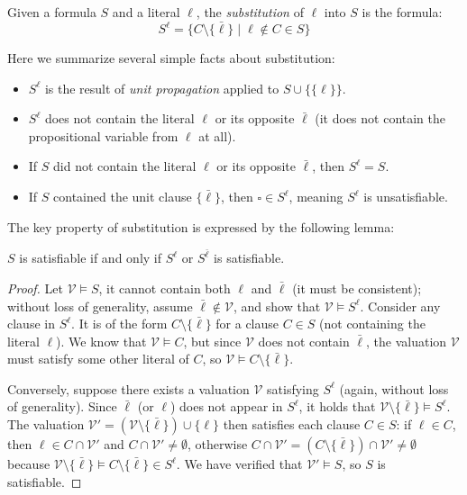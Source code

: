 \begin{definition}
    Given a formula $S$ and a literal $\ell$, the \emph{substitution} of $\ell$ into $S$ is the formula:
    $$
        S^\ell = \{C \setminus \{\bar{\ell}\} \mid \ell \notin C \in S\}
    $$    
\end{definition}

\begin{observation} Here we summarize several simple facts about substitution:
\begin{itemize}
    \item $S^\ell$ is the result of \emph{unit propagation} applied to $S \cup \{\{\ell\}\}$.
    \item $S^\ell$ does not contain the literal $\ell$ or its opposite $\bar{\ell}$ (it does not contain the propositional variable from $\ell$ at all).
    \item If $S$ did not contain the literal $\ell$ or its opposite $\bar{\ell}$, then $S^\ell = S$.
    \item If $S$ contained the unit clause $\{\bar{\ell}\}$, then $\square \in S^\ell$, meaning $S^\ell$ is unsatisfiable.
\end{itemize}    
\end{observation}

The key property of substitution is expressed by the following lemma:

\begin{lemma}\label{lemma:tree-of-reductions}
$S$ is satisfiable if and only if $S^\ell$ or $S^{\bar{\ell}}$ is satisfiable.    
\end{lemma}
\begin{proof}
Let $\mathcal{V} \models S$, it cannot contain both $\ell$ and $\bar{\ell}$ (it must be consistent); without loss of generality, assume $\bar{\ell} \notin \mathcal{V}$, and show that $\mathcal{V} \models S^\ell$. Consider any clause in $S^\ell$. It is of the form $C \setminus \{\bar{\ell}\}$ for a clause $C \in S$ (not containing the literal $\ell$). We know that $\mathcal{V} \models C$, but since $\mathcal{V}$ does not contain $\bar{\ell}$, the valuation $\mathcal{V}$ must satisfy some other literal of $C$, so $\mathcal{V} \models C \setminus \{\bar{\ell}\}$.

Conversely, suppose there exists a valuation $\mathcal{V}$ satisfying $S^\ell$ (again, without loss of generality). Since $\bar{\ell}$ (or $\ell$) does not appear in $S^\ell$, it holds that $\mathcal{V} \setminus \{\bar{\ell}\} \models S^\ell$. The valuation $\mathcal{V}' = (\mathcal{V} \setminus \{\bar{\ell}\}) \cup \{\ell\}$ then satisfies each clause $C \in S$: if $\ell \in C$, then $\ell \in C \cap \mathcal{V}'$ and $C \cap \mathcal{V}' \neq \emptyset$, otherwise $C \cap \mathcal{V}' = (C \setminus \{\bar{\ell}\}) \cap \mathcal{V}' \neq \emptyset$ because $\mathcal{V} \setminus \{\bar{\ell}\} \models C \setminus \{\bar{\ell}\} \in S^\ell$. We have verified that $\mathcal{V}' \models S$, so $S$ is satisfiable.
\end{proof}

